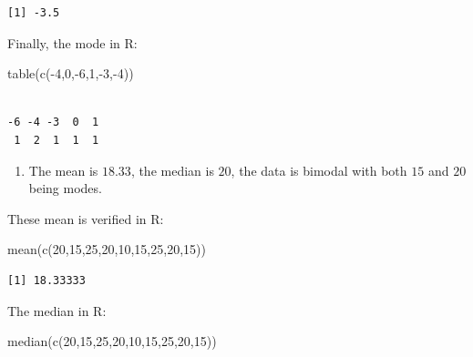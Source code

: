 \documentclass[
  letterpaper,
  DIV=11,
  numbers=noendperiod]{scrreprt}
\newenvironment{Shaded}{\begin{snugshade}}{\end{snugshade}}
\newcommand{\DecValTok}[1]{\textcolor[rgb]{0.68,0.00,0.00}{#1}}
\newcommand{\FunctionTok}[1]{\textcolor[rgb]{0.28,0.35,0.67}{#1}}
\newcommand{\NormalTok}[1]{\textcolor[rgb]{0.00,0.23,0.31}{#1}}
\newcommand{\SpecialCharTok}[1]{\textcolor[rgb]{0.37,0.37,0.37}{#1}}
\providecommand{\tightlist}{%
  \setlength{\itemsep}{0pt}\setlength{\parskip}{0pt}}\usepackage{longtable,booktabs,array}
\begin{document}
\begin{verbatim}
[1] -3.5
\end{verbatim}

Finally, the mode in R:

\begin{Shaded}
\begin{Highlighting}[numbers=left,,]
\FunctionTok{table}\NormalTok{(}\FunctionTok{c}\NormalTok{(}\SpecialCharTok{{-}}\DecValTok{4}\NormalTok{,}\DecValTok{0}\NormalTok{,}\SpecialCharTok{{-}}\DecValTok{6}\NormalTok{,}\DecValTok{1}\NormalTok{,}\SpecialCharTok{{-}}\DecValTok{3}\NormalTok{,}\SpecialCharTok{{-}}\DecValTok{4}\NormalTok{))}
\end{Highlighting}
\end{Shaded}

\begin{verbatim}

-6 -4 -3  0  1 
 1  2  1  1  1 
\end{verbatim}

\begin{blackbox}

\begin{enumerate}
\def\labelenumi{\arabic{enumi}.}
\setcounter{enumi}{2}
\tightlist
\item
  The mean is \(18.33\), the median is \(20\), the data is bimodal with
  both \(15\) and \(20\) being modes.
\end{enumerate}

\end{blackbox}

These mean is verified in R:

\begin{Shaded}
\begin{Highlighting}[numbers=left,,]
\FunctionTok{mean}\NormalTok{(}\FunctionTok{c}\NormalTok{(}\DecValTok{20}\NormalTok{,}\DecValTok{15}\NormalTok{,}\DecValTok{25}\NormalTok{,}\DecValTok{20}\NormalTok{,}\DecValTok{10}\NormalTok{,}\DecValTok{15}\NormalTok{,}\DecValTok{25}\NormalTok{,}\DecValTok{20}\NormalTok{,}\DecValTok{15}\NormalTok{))}
\end{Highlighting}
\end{Shaded}

\begin{verbatim}
[1] 18.33333
\end{verbatim}

The median in R:

\begin{Shaded}
\begin{Highlighting}[numbers=left,,]
\FunctionTok{median}\NormalTok{(}\FunctionTok{c}\NormalTok{(}\DecValTok{20}\NormalTok{,}\DecValTok{15}\NormalTok{,}\DecValTok{25}\NormalTok{,}\DecValTok{20}\NormalTok{,}\DecValTok{10}\NormalTok{,}\DecValTok{15}\NormalTok{,}\DecValTok{25}\NormalTok{,}\DecValTok{20}\NormalTok{,}\DecValTok{15}\NormalTok{))}
\end{Highlighting}
\end{Shaded}
\end{document}
